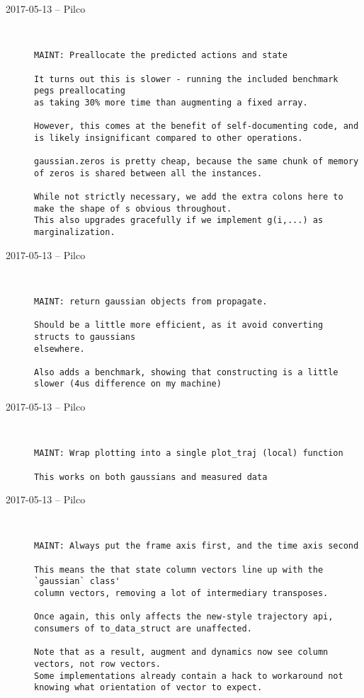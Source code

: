 \begin{description}
  \item[2017-05-13 -- Pilco] \hfill \
\begin{lstlisting}
MAINT: Preallocate the predicted actions and state

It turns out this is slower - running the included benchmark pegs preallocating
as taking 30% more time than augmenting a fixed array.

However, this comes at the benefit of self-documenting code, and is likely insignificant compared to other operations.

gaussian.zeros is pretty cheap, because the same chunk of memory of zeros is shared between all the instances.

While not strictly necessary, we add the extra colons here to make the shape of s obvious throughout.
This also upgrades gracefully if we implement g(i,...) as marginalization.
\end{lstlisting}


  \item[2017-05-13 -- Pilco] \hfill \
\begin{lstlisting}
MAINT: return gaussian objects from propagate.

Should be a little more efficient, as it avoid converting structs to gaussians
elsewhere.

Also adds a benchmark, showing that constructing is a little slower (4us difference on my machine)
\end{lstlisting}


  \item[2017-05-13 -- Pilco] \hfill \
\begin{lstlisting}
MAINT: Wrap plotting into a single plot_traj (local) function

This works on both gaussians and measured data
\end{lstlisting}


  \item[2017-05-13 -- Pilco] \hfill \
\begin{lstlisting}
MAINT: Always put the frame axis first, and the time axis second

This means the that state column vectors line up with the `gaussian` class'
column vectors, removing a lot of intermediary transposes.

Once again, this only affects the new-style trajectory api, consumers of to_data_struct are unaffected.

Note that as a result, augment and dynamics now see column vectors, not row vectors.
Some implementations already contain a hack to workaround not knowing what orientation of vector to expect.
\end{lstlisting}



\end{description}
